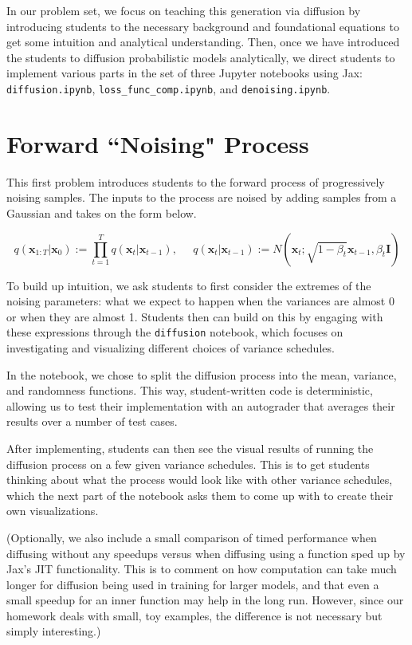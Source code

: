 \documentclass{article}
\begin{document}
In our problem set, we focus on teaching this generation via diffusion by introducing students to the necessary background and foundational equations to get some intuition and analytical understanding. 
Then, once we have introduced the students to diffusion probabilistic models analytically, we direct students to implement various parts in the set of three Jupyter notebooks using Jax: \verb|diffusion.ipynb|, \verb|loss_func_comp.ipynb|, and \verb|denoising.ipynb|. 

\section{Forward ``Noising" Process}

This first problem introduces students to the forward process of progressively noising samples.
The inputs to the process are noised by adding samples from a Gaussian and takes on the form below.

\begin{equation}
    q(\textbf{x}_{1:T}|\textbf{x}_{0}) := \prod_{t=1}^{T} q(\textbf{x}_{t}|\textbf{x}_{t - 1}),\;\;\;\;\;q(\textbf{x}_{t}|\textbf{x}_{t - 1}) := N(\textbf{x}_{t}; \sqrt{1 - \beta_{t}}\textbf{x}_{t-1}, \beta_{t} \textbf{I})
\end{equation}

To build up intuition, we ask students to first consider the extremes of the noising parameters: what we expect to happen when the variances are almost 0 or when they are almost 1.
Students then can build on this by engaging with these expressions through the \verb|diffusion| notebook, which focuses on investigating and visualizing different choices of variance schedules.

In the notebook, we chose to split the diffusion process into the mean, variance, and randomness functions. This way, student-written code is deterministic, allowing us to test their implementation with an autograder that averages their results over a number of test cases.

After implementing, students can then see the visual results of running the diffusion process on a few given variance schedules. 
This is to get students thinking about what the process would look like with other variance schedules, which the next part of the notebook asks them to come up with to create their own visualizations.

(Optionally, we also include a small comparison of timed performance when diffusing without any speedups versus when diffusing using a function sped up by Jax's JIT functionality. This is to comment on how computation can take much longer for diffusion being used in training for larger models, and that even a small speedup for an inner function may help in the long run. However, since our homework deals with small, toy examples, the difference is not necessary but simply interesting.)
\end{document}
